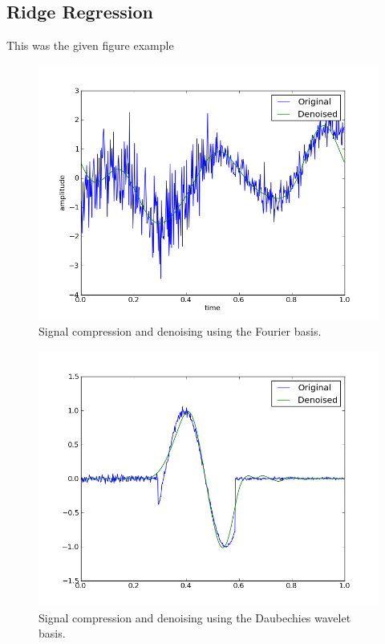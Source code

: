 \documentclass[10pt,conference,compsocconf]{IEEEtran}
\begin{document}
\subsection{Ridge Regression}
This was the given figure example
\begin{figure}[tbp]
  \centering
  \includegraphics[width=\columnwidth]{denoised_signal_1d}
  \caption{Signal compression and denoising using the Fourier basis.}
  \vspace{-3mm}
  \label{fig:denoise-fourier}
\end{figure}
\begin{figure}[htbp]
  \centering
  \includegraphics[width=\columnwidth]{local_wdenoised_1d}
  \vspace{-3mm}
  \caption{Signal compression and denoising using the Daubechies wavelet basis.}
  \label{fig:denoise-wavelet}
\end{figure}
\end{document}
